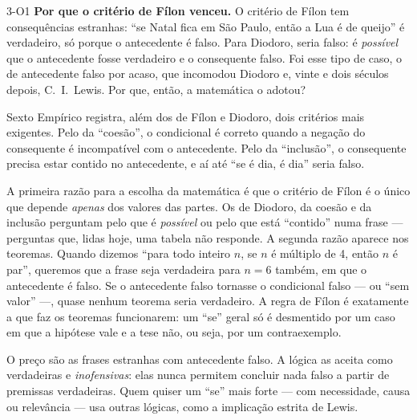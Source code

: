 \Observacoes

\begin{obs}{3-O1}
\textbf{Por que o critério de Fílon venceu.} O critério de Fílon tem consequências estranhas: \enquote{se Natal fica em São Paulo, então a Lua é de queijo} é verdadeiro, só porque o antecedente é falso. Para Diodoro, seria falso: é \emph{possível} que o antecedente fosse verdadeiro e o consequente falso. Foi esse tipo de caso, o de antecedente falso por acaso, que incomodou Diodoro e, vinte e dois séculos depois, C.~I.~Lewis. Por que, então, a matemática o adotou?

Sexto Empírico registra, além dos de Fílon e Diodoro, dois critérios mais exigentes. Pelo da \enquote{coesão}, o condicional é correto quando a negação do consequente é incompatível com o antecedente. Pelo da \enquote{inclusão}, o consequente precisa estar contido no antecedente, e aí até \enquote{se é dia, é dia} seria falso.

A primeira razão para a escolha da matemática é que o critério de Fílon é o único que depende \emph{apenas} dos valores das partes. Os de Diodoro, da coesão e da inclusão perguntam pelo que é \emph{possível} ou pelo que está \enquote{contido} numa frase — perguntas que, lidas hoje, uma tabela não responde. A segunda razão aparece nos teoremas. Quando dizemos \enquote{para todo inteiro $n$, se $n$ é múltiplo de 4, então $n$ é par}, queremos que a frase seja verdadeira para $n=6$ também, em que o antecedente é falso. Se o antecedente falso tornasse o condicional falso — ou \enquote{sem valor} —, quase nenhum teorema seria verdadeiro. A regra de Fílon é exatamente a que faz os teoremas funcionarem: um \enquote{se} geral só é desmentido por um caso em que a hipótese vale e a tese não, ou seja, por um contraexemplo.

O preço são as frases estranhas com antecedente falso. A lógica as aceita como verdadeiras e \emph{inofensivas}: elas nunca permitem concluir nada falso a partir de premissas verdadeiras. Quem quiser um \enquote{se} mais forte — com necessidade, causa ou relevância — usa outras lógicas, como a implicação estrita de Lewis.
\end{obs}

